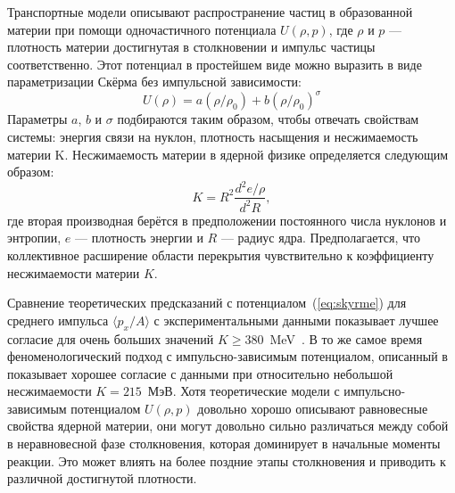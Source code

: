 Транспортные модели описывают распространение частиц в образованной материи при помощи одночастичного потенциала $U(\rho, p)$, где $\rho$ и $p$ --- плотность материи достигнутая в столкновении и импульс частицы соответственно.
Этот потенциал в простейшем виде можно выразить в виде параметризации Скёрма без импульсной зависимости:
\begin{equation}
    U(\rho) = a(\rho/\rho_0) + b(\rho/\rho_0)^\sigma
    \label{eq:skyrme}
\end{equation}
Параметры $a$, $b$ и $\sigma$ подбираются таким образом, чтобы отвечать свойствам системы: энергия связи на нуклон, плотность насыщения и несжимаемость материи K.
Несжимаемость материи в ядерной физике определяется следующим образом:
\begin{equation}
    K = R^2 \frac{d^2 e/\rho}{ d^2 R },
\end{equation}
где вторая производная берётся в предположении постоянного числа нуклонов и энтропии, $e$ --- плотность энергии и $R$ --- радиус ядра.
Предполагается, что коллективное расширение области перекрытия чувствительно к коэффициенту несжимаемости материи $K$.

Сравнение теоретических предсказаний с потенциалом~(\ref{eq:skyrme}) для среднего импульса $\langle p_x / A \rangle$ с экспериментальными данными показывает лучшее согласие для очень больших значений $K \ge 380$~MeV~\cite{Kruse:1985hy, Molitoris:1985gs}.
В то же самое время феноменологический подход с импульсно-зависимым потенциалом, описанный в~\cite{Gale:1987zz, Aichelin:1987ti, Welke:1988zz, Haddad:1995vt} показывает хорошее согласие с данными при относительно небольшой несжимаемости $K=215$~МэВ.
Хотя теоретические модели с импульсно-зависимым потенциалом $U(\rho, p)$ довольно хорошо описывают равновесные свойства ядерной материи, они могут довольно сильно различаться между собой в неравновесной фазе столкновения, которая доминирует в начальные моменты реакции.
Это может влиять на более поздние этапы столкновения и приводить к различной достигнутой плотности.

